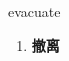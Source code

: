 
\begin{frame}
{\huge evacuate}
\begin{center}
\begin{enumerate}\Large
  \item \textbf{撤离}
\end{enumerate}
\end{center}
\end{frame}
